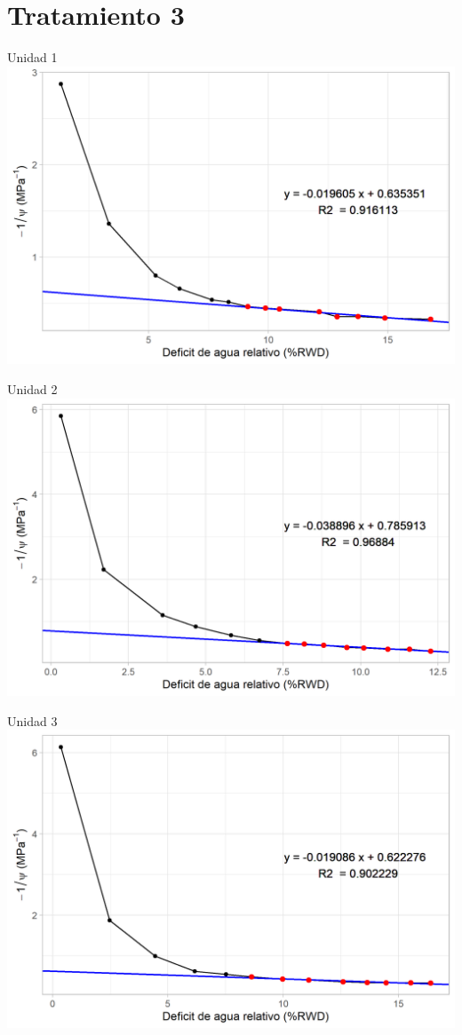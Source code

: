 \documentclass[
  letterpaper,
  DIV=11,
  numbers=noendperiod]{scrreprt}
\begin{document}
\chapter{Tratamiento 3}

Unidad 1 \includegraphics{figuras/06_tlp/tlp_rio_claro_T3_1.png}

Unidad 2 \includegraphics{figuras/06_tlp/tlp_rio_claro_T3_2.png}

Unidad 3 \includegraphics{figuras/06_tlp/tlp_rio_claro_T3_3.png}
\end{document}
